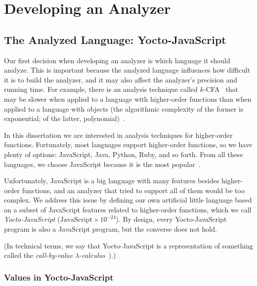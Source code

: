 \documentclass[12pt, oneside]{book}
\begin{document}
\chapter{Developing an Analyzer}


\section{The Analyzed Language: Yocto-JavaScript}
\label{The Analyzed Language: Yocto-JavaScript}

Our first decision when developing an analyzer is which language it should analyze. This is important because the analyzed language influences how difficult it is to build the analyzer, and it may also affect the analyzer’s precision and running time. For example, there is an analysis technique called $k$-CFA~\cite{k-cfa} that may be slower when applied to a language with higher-order functions than when applied to a language with objects (the algorithmic complexity of the former is exponential; of the latter, polynomial)~\cite{m-cfa}.

In this dissertation we are interested in analysis techniques for higher-order functions. Fortunately, most languages support higher-order functions, so we have plenty of options: JavaScript, Java, Python, Ruby, and so forth. From all these languages, we choose JavaScript because it is the most popular~\cite{stack-overflow-developer-survey, jet-brains-developer-survey}.

Unfortunately, JavaScript is a big language with many features besides higher-order functions, and an analyzer that tried to support all of them would be too complex. We address this issue by defining our own artificial little language based on a subset of JavaScript features related to higher-order functions, which we call \emph{Yocto-JavaScript} ($\mathrm{JavaScript} \times 10^{-24}$). By design, every Yocto-JavaScript program is also a JavaScript program, but the converse does not hold.

(In technical terms, we say that Yocto-JavaScript is a representation of something called the \emph{call-by-value $\lambda$-calculus}~\cite[§~6]{understanding-computation}).)

\subsection{Values in Yocto-JavaScript}
\label{Values in Yocto-JavaScript}
\end{document}
